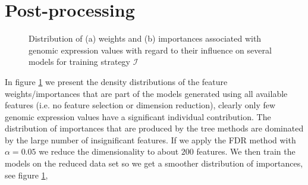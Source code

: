 \documentclass[a4paper,10pt]{article}
\begin{document}
\section{Post-processing}
%
\begin{figure}[htp!]
\centering
\vspace{0.5cm}
\caption{Distribution of (a) weights and (b) importances associated with genomic expression values with regard to their
influence on several models for training strategy $\mathcal{I}$}
\label{fig:weightsFromModels}
\end{figure}
%
In figure \ref{fig:weightsFromModels} we present the density distributions of the feature weights/importances that
are part of the models generated using all available features (i.e. no feature selection or dimension reduction), 
clearly only few genomic expression values have a significant individual contribution. The distribution of importances that are
produced by the tree methods are dominated by the large number of insignificant features. 
If we apply the FDR method with $\alpha=0.05$ we reduce the dimensionality to about $200$ features. We then train the
models on the reduced data set so we get a smoother distribution of importances, see figure \ref{fig:weightsFromModels}, 
\end{document}
